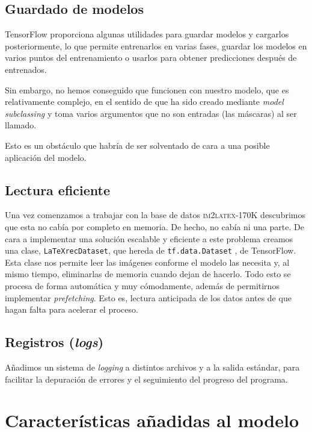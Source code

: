 \documentclass[a4paper, 20pt, dvipsnames]{article}
\begin{document}
\subsection{Guardado de modelos}

TensorFlow proporciona algunas utilidades para guardar modelos y cargarlos
posteriormente, lo que permite entrenarlos en varias fases, guardar los modelos
en varios puntos del entrenamiento o usarlos para obtener predicciones después
de entrenados.

Sin embargo, no hemos conseguido que funcionen con nuestro modelo, que es
relativamente complejo, en el sentido de que ha sido creado mediante \emph{model
  subclassing} y toma varios argumentos que no son entradas (las máscaras) al
ser llamado.

Esto es un obstáculo que habría de ser solventado de cara a una posible
aplicación del modelo.

\subsection{Lectura eficiente}

Una vez comenzamos a trabajar con la base de datos \textsc{im2latex-170K}
descubrimos que esta no cabía por completo en memoria. De hecho, no cabía ni una
parte. De cara a implementar una solución escalable y eficiente a este problema
creamos una clase, \texttt{LaTeXrecDataset}, que hereda de
\texttt{tf.data.Dataset} \cite{tf_dataset}, de TensorFlow. Esta clase nos
permite leer las imágenes conforme el modelo las necesita y, al mismo tiempo,
eliminarlas de memoria cuando dejan de hacerlo. Todo esto se procesa de forma
automática y muy cómodamente, además de permitirnos implementar
\emph{prefetching}. Esto es, lectura anticipada de los datos antes de que hagan
falta para acelerar el proceso.

\subsection{Registros (\emph{logs})}

Añadimos un sistema de \emph{logging} a distintos archivos y a la salida
estándar, para facilitar la depuración de errores y el seguimiento del progreso
del programa.


\section{Características añadidas al modelo}
\end{document}
